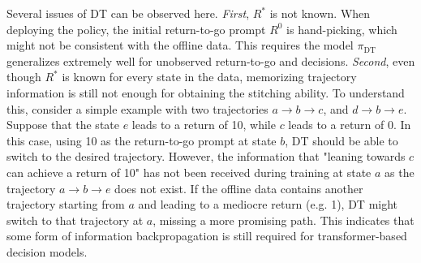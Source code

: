 Several issues of DT can be observed here. \emph{First}, $R^*$ is not known. When deploying the policy, the initial return-to-go prompt $R^0$ is hand-picking, which might not be consistent with the offline data. This requires the model $\pi_{\mathrm{DT}}$ generalizes extremely well for unobserved return-to-go and decisions. 
\emph{Second}, even though $R^*$ is known for every state in the data, memorizing trajectory information is still not enough for obtaining the stitching ability. 
To understand this, 
consider a simple example with two trajectories $a\rightarrow b\rightarrow c$, and $d\rightarrow b\rightarrow e$. Suppose that the state $e$ leads to a return of 10, while $c$ leads to a return of 0. 
In this case, using 10 as the return-to-go prompt at state $b$, DT should be able to switch to the desired trajectory. 
However, the information that "leaning towards $c$ can achieve a return of 10" has not been received during training at state $a$ as the trajectory $a\rightarrow b\rightarrow e$ does not exist. 
If the offline data contains another trajectory starting from $a$ and leading to a mediocre return (e.g. 1), DT might switch to that trajectory at $a$, missing a more promising path. 
This indicates that some form of information backpropagation is still required  for transformer-based decision models.  

\fi

